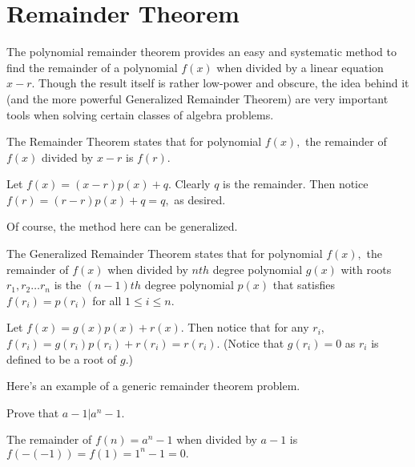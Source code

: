 \documentclass{article}
\begin{document}
\section{Remainder Theorem}
The polynomial remainder theorem provides an easy and systematic method to find the remainder of a polynomial $f(x)$ when divided by a linear equation $x-r.$ Though the result itself is rather low-power and obscure, the idea behind it (and the more powerful Generalized Remainder Theorem) are very important tools when solving certain classes of algebra problems.
\begin{theo}
The Remainder Theorem states that for polynomial $f(x),$ the remainder of $f(x)$ divided by $x-r$ is $f(r).$
\end{theo}

\begin{pro}
Let $f(x)=(x-r)p(x)+q.$ Clearly $q$ is the remainder. Then notice $f(r)=(r-r)p(x)+q=q,$ as desired.
\end{pro}

Of course, the method here can be generalized.
\begin{theo}
The Generalized Remainder Theorem states that for polynomial $f(x),$ the remainder of $f(x)$ when divided by $nth$ degree polynomial $g(x)$ with roots $r_1,r_2\dots r_n$ is the $(n-1)th$ degree polynomial $p(x)$ that satisfies $f(r_i)=p(r_i)$ for all $1\leq i\leq n.$
\end{theo}

\begin{pro}
Let $f(x)=g(x)p(x)+r(x).$ Then notice that for any $r_i,$ $f(r_i)=g(r_i)p(r_i)+r(r_i)=r(r_i).$ (Notice that $g(r_i)=0$ as $r_i$ is defined to be a root of $g.$)
\end{pro}

Here's an example of a generic remainder theorem problem.

\begin{exam}
Prove that $a-1|a^n-1.$
\end{exam}

\begin{sol}
The remainder of $f(n)=a^n-1$ when divided by $a-1$ is $f(-(-1))=f(1)=1^n-1=0.$
\end{sol}
\end{document}
